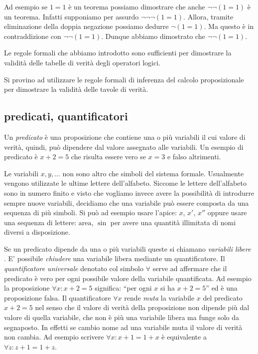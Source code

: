 Ad esempio se $1=1$ è un teorema possiamo dimostrare 
che anche $\lnot \lnot (1=1)$ è un teorema.
Infatti supponiamo per assurdo $\lnot \lnot \lnot (1=1)$.
Allora, tramite eliminazione della doppia negazione possiamo 
dedurre $\lnot (1=1)$. Ma questo è in contraddizione 
con $\lnot \lnot (1=1)$. Dunque abbiamo dimostrato che 
$\lnot \lnot (1=1)$.

Le regole formali che abbiamo introdotto sono sufficienti 
per dimostrare la validità delle tabelle di verità degli 
operatori logici.

\begin{exercise}
Si provino ad utilizzare le regole formali di inferenza del 
calcolo proposizionale per dimostrare la validità delle 
tavole di verità.
\end{exercise}

\subsection{predicati, quantificatori}

Un \emph{predicato}%
%
 è una proposizione che contiene
una o più variabili il cui valore di verità, quindi,
può dipendere dal valore assegnato alle variabili.
Un esempio di predicato è $x+2=5$ che risulta essere vero se $x=3$
e falso altrimenti.

Le variabili $x,y,\dots$ non sono altro che simboli 
del sistema formale. 
Usualmente vengono utilizzate le ultime lettere dell'alfabeto.
Siccome le lettere dell'alfabeto sono in numero finito
e visto che vogliamo invece avere la possibilità di introdurre 
sempre nuove variabili, decidiamo che 
una variabile può essere composta da una sequenza di più simboli. 
Si può ad esempio usare l'apice: $x$, $x'$, $x''$ oppure 
usare una sequenza di lettere: $\textrm{area}$, $\sin$
per avere una quantità illimitata di nomi diversi a disposizione.

Se un predicato dipende da una o più variabili queste
si chiamano \emph{variabili libere}%
%
. E' possibile
\emph{chiudere} una variabile libera mediante un quantificatore.
Il \emph{quantificatore universale}%
%
 denotato col simbolo
$\forall$ serve ad affermare che il predicato è vero
per ogni possibile valore della variabile quantificata.
Ad esempio la proposizione $\forall x\colon x+2=5$ significa:
``per ogni $x$ si ha $x+2=5$'' ed è una proposizione falsa.
Il quantificatore $\forall x$ rende \emph{muta} la variabile
$x$ del predicato $x+2=5$ nel senso che il valore di verità 
della proposizione
non dipende più dal valore di quella variabile, che non è
più una variabile libera ma funge solo da segnaposto.
In effetti se cambio nome ad una variabile muta il valore 
di verità non cambia. Ad esempio scrivere $\forall x\colon x+1=1+x$
è equivalente a $\forall z\colon z+1=1+z$.

